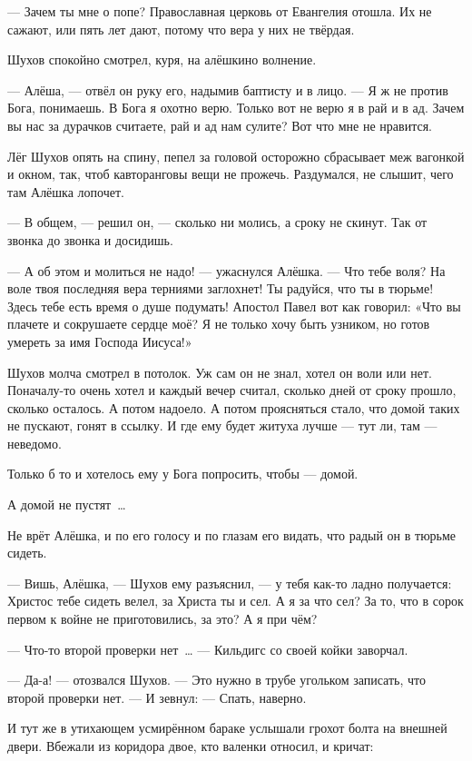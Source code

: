 --- Зачем ты мне о попе? Православная церковь от Евангелия отошла. Их не сажают, или пять лет 
дают, потому что вера у них не твёрдая.

Шухов спокойно смотрел, куря, на алёшкино волнение.

--- Алёша, --- отвёл он руку его, надымив баптисту и в лицо. --- Я ж не против Бога, понимаешь. В 
Бога я охотно верю. Только вот не верю я в рай и в ад. Зачем вы нас за дурачков считаете, рай и 
ад нам сулите? Вот что мне не нравится.

Лёг Шухов опять на спину, пепел за головой осторожно сбрасывает меж вагонкой и окном, так, 
чтоб кавторанговы вещи не прожечь. Раздумался, не слышит, чего там Алёшка лопочет.

--- В общем, --- решил он, --- сколько ни молись, а сроку не скинут. Так от звонка до звонка и 
досидишь.

--- А об этом и молиться не надо! --- ужаснулся Алёшка. --- Что тебе воля? На воле твоя последняя 
вера терниями заглохнет! Ты радуйся, что ты в тюрьме! Здесь тебе есть время о душе подумать! 
Апостол Павел вот как говорил: «Что вы плачете и сокрушаете сердце моё? Я не только хочу быть 
узником, но готов умереть за имя Господа Иисуса!»

Шухов молча смотрел в потолок. Уж сам он не знал, хотел он воли или нет. Поначалу-то очень 
хотел и каждый вечер считал, сколько дней от сроку прошло, сколько осталось. А потом надоело. 
А потом проясняться стало, что домой таких не пускают, гонят в ссылку. И где ему будет житуха 
лучше --- тут ли, там --- неведомо.

Только б то и хотелось ему у Бога попросить, чтобы --- домой.

А домой не пустят~\dots{}

Не врёт Алёшка, и по его голосу и по глазам его видать, что радый он в тюрьме сидеть.

--- Вишь, Алёшка, --- Шухов ему разъяснил, --- у тебя как-то ладно получается: Христос тебе сидеть 
велел, за Христа ты и сел. А я за что сел? За то, что в сорок первом к войне не приготовились, за 
это? А я при чём?

--- Что-то второй проверки нет~\dots{} --- Кильдигс со своей койки заворчал.

--- Да-а! --- отозвался Шухов. --- Это нужно в трубе угольком записать, что второй проверки нет. --- 
И зевнул: --- Спать, наверно.

И тут же в утихающем усмирённом бараке услышали грохот болта на внешней двери. Вбежали из 
коридора двое, кто валенки относил, и кричат:


